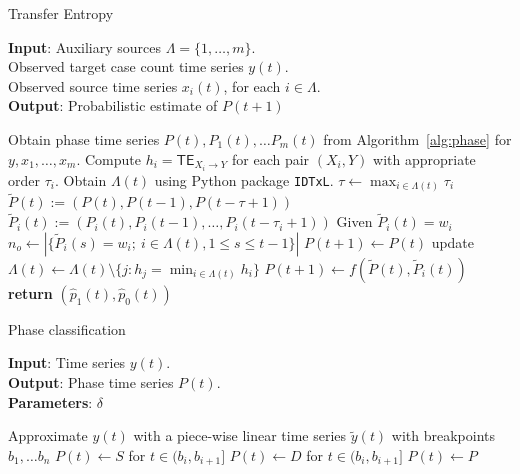 \documentclass[conference,compsoc]{IEEEtran}
\begin{document}
\begin{algorithm}[!t]
\caption{Transfer Entropy}
\label{alg:TE}
\textbf{Input}:  Auxiliary sources $\Lambda =\{1, \dots, m\}.$\\
Observed target case count time series $y(t)$.\\
Observed source time series $x_i(t)$, for each $i\in\Lambda$.\\
\textbf{Output}: Probabilistic estimate of $P(t+1)$\\
\begin{algorithmic}[1]
\STATE Obtain phase time series  $P(t), P_1(t), \dots P_m(t)$ from Algorithm~\ref{alg:phase} for $y, x_1, \dots, x_m$.
\STATE Compute $h_i = \mathsf{TE}_{X_i\to Y}$ for each pair $(X_i, Y)$ with appropriate order $\tau_i$.
\STATE Obtain $\Lambda(t)$ using Python package \verb|IDTxL|.
  \STATE $\tau \gets \max_{i\in\Lambda(t)} \tau_i$\\
  $\tilde P(t) := (P(t), P(t-1), P(t-\tau+1))$
  \STATE $\tilde P_i(t) := (P_i(t), P_i(t-1), \dots,  P_i(t-\tau_i+1))$
  \ENDFOR
  \STATE Given  $\tilde P_i(t) = w_i$ \\
  $n_o \gets |\{\tilde P_i(s) =  w_i;~ i\in \Lambda(t), 1\leq s\leq t-1\}|$
    \STATE $P(t+1) \gets P(t)$
  \ELSE
    \STATE update $\Lambda(t) \gets \Lambda(t)\setminus \{j: h_j = \min_{i\in \Lambda(t)} h_i\}$
  \ENDWHILE
    \STATE $P(t+1) \gets f(\tilde P(t), \tilde P_i(t)) $
  \ENDIF
 \STATE \textbf{return}  $(\hat p_1(t), \hat p_0(t)) $
\end{algorithmic}
\end{algorithm}


\begin{algorithm}[ht]
\caption{Phase classification}
\label{alg:phase}
\textbf{Input}:  Time series $y(t)$.\\
\textbf{Output}:  Phase time series  $P(t)$.\\
\textbf{Parameters}: $\delta$
\begin{algorithmic}[1]
\STATE Approximate $y(t)$ with a piece-wise linear time series $\tilde y(t)$ with breakpoints $b_1, \dots b_n$
    \STATE $P(t) \gets S$ for $t\in (b_i, b_{i+1}]$
  \ELSE {}
    \STATE $P(t) \gets D$ for $t\in (b_i, b_{i+1}]$
    \ELSE 
    \STATE $P(t) \gets P$
  \ENDIF
      \ENDIF
\end{algorithmic}
\end{algorithm}
\end{document}

